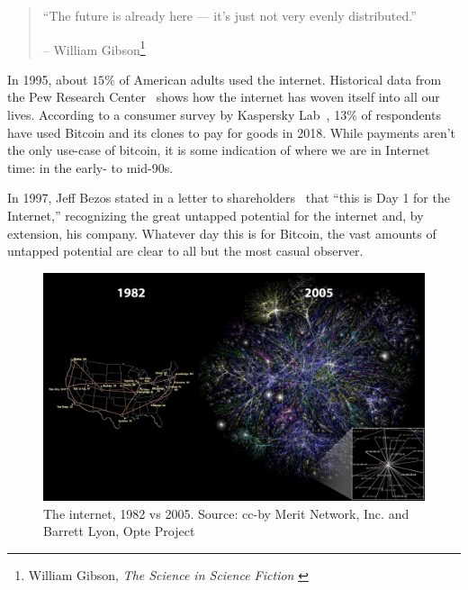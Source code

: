 \begin{quotation}\begin{samepage}
\enquote{The future is already here --- it's just not very evenly
distributed.}
\begin{flushright} -- William Gibson\footnote{William Gibson, \textit{The Science in Science Fiction} \cite{william-gibson}}
\end{flushright}\end{samepage}\end{quotation}

In 1995, about $15\%$ of American adults used the internet. Historical
data from the Pew Research Center~\cite{pew-research} shows how the internet has woven
itself into all our lives. According to a consumer survey by Kaspersky
Lab~\cite{web:kaspersky}, 13\% of respondents have used Bitcoin and its clones to pay for
goods in 2018. While payments aren't the only use-case of bitcoin, it is
some indication of where we are in Internet time: in the early- to
mid-90s.

In 1997, Jeff Bezos stated in a letter to shareholders~\cite{bezos-letter} that
\enquote{this is Day 1 for the Internet,} recognizing the great untapped
potential for the internet and, by extension, his company. Whatever day this is
for Bitcoin, the vast amounts of untapped potential are clear to all but the
most casual observer.

\begin{figure}
  \includegraphics{assets/images/internet-evolution-black-dates.png}
  \caption{The internet, 1982 vs 2005. Source: cc-by Merit Network, Inc. and Barrett Lyon, Opte Project}
  \label{fig:internet-evolution-black-dates}
\end{figure}

